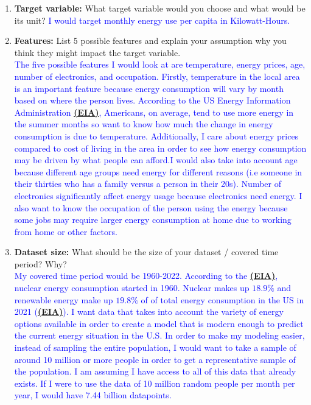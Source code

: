 \documentclass[submit]{harvardml}
\begin{document}
\begin{problem}
\begin{enumerate}
\item \textbf{Target variable:} What target variable would you choose and what would be its unit? \textcolor{blue}{I would target monthly energy use per capita in Kilowatt-Hours.}
\item \textbf{Features:}  List 5 possible features and explain your assumption why you think they might impact the target variable. \\
\textcolor{blue}{The five possible features I would look at are temperature, energy prices, age, number of electronics, and occupation. Firstly, temperature in the local area is an important feature because energy consumption will vary by month based on where the person lives. According to the US Energy Information Administration \textbf{\href{https://www.eia.gov/electricity/monthly/update/}{(EIA)}}, Americans, on average, tend to use more energy in the summer months so want to know how much the change in energy consumption is due to temperature. Additionally, I care about energy prices compared to cost of living in the area in order to see how energy consumption may be driven by what people can afford.I would also take into account age because different age groups need energy for different reasons (i.e someone in their thirties who has a family versus a person in their 20s). Number of electronics significantly affect energy usage because electronics need energy. I also want to know the occupation of the person using the energy because some jobs may require larger energy consumption at home due to working from home or other factors.}
\item \textbf{Dataset size:} What should be the size of your dataset / covered time period? Why? \\
\textcolor{blue}{
My covered time period would be 1960-2022. According to the \textbf{\href{https://www.eia.gov/todayinenergy/detail.php?id=10}{(EIA)}}, nuclear energy consumption started in 1960. Nuclear makes up $18.9\%$ and renewable energy make up $19.8\%$ of of total energy consumption in the US in 2021 (\textbf{\href{https://www.eia.gov/tools/faqs/faq.php?id=427&t=3}{(EIA)}}). I want data that takes into account the variety of energy options available in order to create a model that is modern enough to predict the current energy situation in the U.S. In order to make my modeling easier, instead of sampling the entire population, I would want to take a sample of around 10 million or more people in order to get a representative sample of the population. I am assuming I have access to all of this data that already exists. If I were to use the data of 10 million random people per month per year, I would have 7.44 billion datapoints. 
}
\end{enumerate}
\end{problem}
\end{document}
